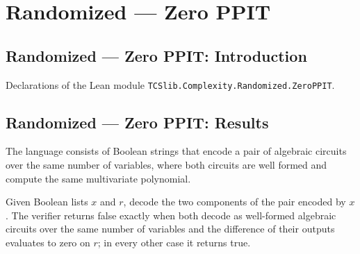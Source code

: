 \section{Randomized --- Zero PPIT}
\subsection*{Randomized --- Zero PPIT: Introduction}

Declarations of the Lean module \texttt{TCSlib.Complexity.Randomized.ZeroPPIT}.

\subsection*{Randomized --- Zero PPIT: Results}

\begin{definition}
\label{Randomized.PITLang}
\leanok
{}
The language consists of Boolean strings that encode a pair of algebraic circuits over
the same number of variables, where both circuits are well formed and compute the same
multivariate polynomial.
\end{definition}

\begin{definition}
\label{Randomized.pitVerifier}
\leanok
{}
Given Boolean lists $x$ and $r$, decode the two components of the pair encoded by $x$.
The verifier returns false exactly when both decode as well-formed algebraic circuits
over the same number of variables and the difference of their outputs evaluates to zero
on $r$; in every other case it returns true.
\end{definition}

